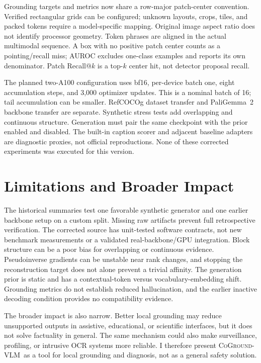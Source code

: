 \documentclass[11pt,a4paper]{article}
\newcommand{\method}{\textsc{CoGround-VLM}}
\begin{document}
Grounding targets and metrics now share a row-major patch-center convention. Verified rectangular grids can be configured; unknown layouts, crops, tiles, and packed tokens require a model-specific mapping. Original image aspect ratio does not identify processor geometry. Token phrases are aligned in the actual multimodal sequence. A box with no positive patch center counts as a pointing/recall miss; AUROC excludes one-class examples and reports its own denominator. Patch Recall@$k$ is a top-$k$ center hit, not detector proposal recall.

The planned two-A100 configuration uses bf16, per-device batch one, eight accumulation steps, and 3,000 optimizer updates. This is a nominal batch of 16; tail accumulation can be smaller. RefCOCOg dataset transfer and PaliGemma~2 backbone transfer are separate. Synthetic stress tests add overlapping and continuous structure. Generation must pair the same checkpoint with the prior enabled and disabled. The built-in caption scorer and adjacent baseline adapters are diagnostic proxies, not official reproductions. None of these corrected experiments was executed for this version.

\section{Limitations and Broader Impact}
\label{sec:limitations}

The historical summaries test one favorable synthetic generator and one earlier backbone setup on a custom split. Missing raw artifacts prevent full retrospective verification. The corrected source has unit-tested software contracts, not new benchmark measurements or a validated real-backbone/GPU integration. Block structure can be a poor bias for overlapping or continuous evidence. Pseudoinverse gradients can be unstable near rank changes, and stopping the reconstruction target does not alone prevent a trivial affinity. The generation prior is static and has a contextual-token versus vocabulary-embedding shift. Grounding metrics do not establish reduced hallucination, and the earlier inactive decoding condition provides no compatibility evidence.

The broader impact is also narrow. Better local grounding may reduce unsupported outputs in assistive, educational, or scientific interfaces, but it does not solve factuality in general. The same mechanism could also make surveillance, profiling, or intrusive OCR systems more reliable. I therefore present \method\ as a tool for local grounding and diagnosis, not as a general safety solution.
\end{document}
